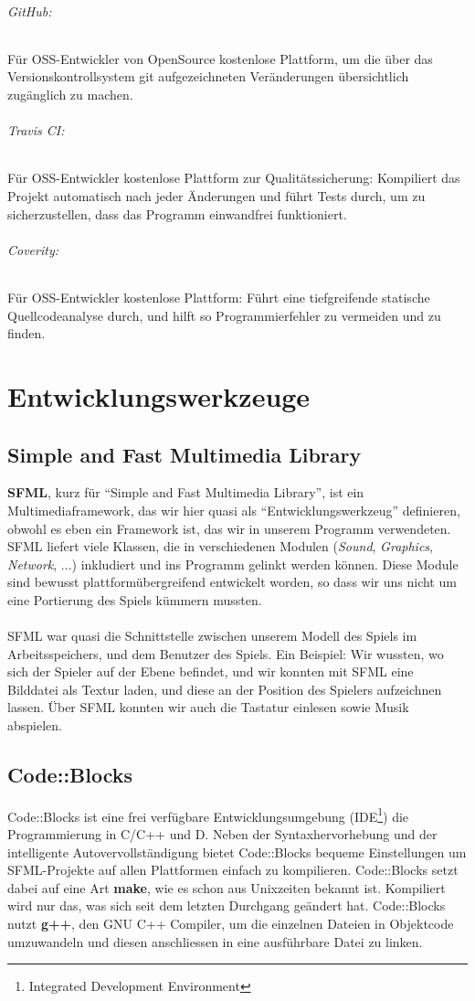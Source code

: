 \documentclass[11pt,a4paper]{scrbook}
\newcommand{\q}[1]{``#1''}
\begin{document}
\subparagraph{GitHub:}
Für OSS-Entwickler von OpenSource kostenlose Plattform, um die über das Versionskontrollsystem git aufgezeichneten Veränderungen übersichtlich zugänglich zu machen.

\subparagraph{Travis CI:}
Für OSS-Entwickler kostenlose Plattform zur Qualitätssicherung: Kompiliert das Projekt automatisch nach jeder Änderungen und führt Tests durch, um zu sicherzustellen, dass das Programm einwandfrei funktioniert.

\subparagraph{Coverity:}
Für OSS-Entwickler kostenlose Plattform: Führt eine tiefgreifende statische Quellcodeanalyse durch, und hilft so Programmierfehler zu vermeiden und zu finden.

\chapter{Entwicklungswerkzeuge}
\section{Simple and Fast Multimedia Library}
\textbf{SFML}, kurz für \q{Simple and Fast Multimedia Library}, ist ein Multimediaframework, das wir hier quasi als
\q{Entwicklungswerkzeug} definieren, obwohl es eben ein Framework ist, das wir in unserem Programm verwendeten. SFML
liefert viele Klassen, die in verschiedenen Modulen (\textit{Sound}, \textit{Graphics}, \textit{Network}, ...) inkludiert
und ins Programm gelinkt werden können. Diese Module sind bewusst plattformübergreifend entwickelt worden, so dass wir uns
nicht um eine Portierung des Spiels kümmern mussten.
\\
\\
SFML war quasi die Schnittstelle zwischen unserem Modell des Spiels im Arbeitsspeichers, und dem Benutzer des Spiels. Ein Beispiel:
Wir wussten, wo sich der Spieler auf der Ebene befindet, und wir konnten mit SFML eine Bilddatei als Textur laden, und diese
an der Position des Spielers aufzeichnen lassen. Über SFML konnten wir auch die Tastatur einlesen sowie Musik abspielen.

\section{Code::Blocks}
Code::Blocks ist eine frei verfügbare Entwicklungsumgebung (IDE\footnote{Integrated Development Environment}) die Programmierung in C/C++ und D.
Neben der Syntaxhervorhebung und der intelligente Autovervollständigung bietet Code::Blocks bequeme Einstellungen um SFML-Projekte auf allen Plattformen
einfach zu kompilieren. Code::Blocks setzt dabei auf eine Art \textbf{make}, wie es schon aus Unixzeiten bekannt ist. Kompiliert wird nur das, was sich
seit dem letzten Durchgang geändert hat. Code::Blocks nutzt \textbf{g++}, den GNU C++ Compiler, um die einzelnen Dateien in Objektcode umzuwandeln und diesen
anschliessen in eine ausführbare Datei zu linken.
\end{document}
